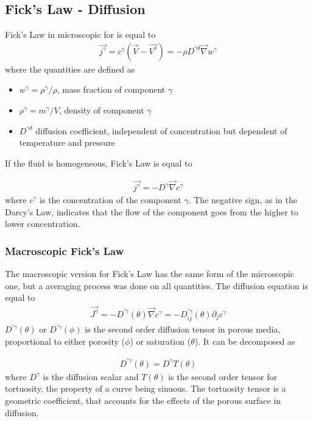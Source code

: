 \documentclass[11pt,twoside]{report}
\begin{document}
\subsection{Fick's Law -  Diffusion}\label{fick}
Fick's Law in microscopic for is equal to 
\begin{align}
   \vec{j^{\gamma}} = c^{\gamma}\left(\vec{V} - \vec{V^{\gamma}}\right) = -\rho D^{\gamma \delta}\vec{\nabla}w^{\gamma}
\end{align}
where the quantities are defined as 
\begin{itemize}
   \item $w^{\gamma} = \rho^{\gamma}/\rho$, mass fraction of component $\gamma$
   \item $\rho^{\gamma} = m^{\gamma}/V$, density of component $\gamma$
   \item $D^{\gamma \delta}$ diffusion coefficient, independent of concentration but dependent of temperature and pressure
\end{itemize}
If the fluid is homogeneous, Fick's Law is equal to

\begin{align}
   \vec{j^{\gamma}} = -D^{\gamma}\vec{\nabla}c^{\gamma}
\end{align}
where $c^{\gamma}$ is the concentration of the component $\gamma$. The negative sign, as in the Darcy's Law, indicates that the flow of the component goes from the higher to lower concentration. 

\subsubsection{Macroscopic Fick's Law}
The macroscopic version for Fick's Law has the same form of the microscopic one, but a averaging process was done on all quantities. The diffusion equation is equal to 
\begin{align}
\vec{J^{\gamma}} = - D^{'\gamma}(\theta)\vec{\nabla}c^{\gamma} = -D_{ij}^{'\gamma}(\theta)\partial_{j}c^{\gamma}
\end{align}
$D^{'\gamma}(\theta)$ or $D^{'\gamma}(\phi)$ is the second order diffusion tensor in porous media, proportional to either porosity ($\phi$) or saturation ($\theta$). It can be decomposed as

\begin{align}
   D^{'\gamma}(\theta) = D^{\gamma}T(\theta)
\end{align}
where $D^{\gamma}$ is the diffusion scalar and $T(\theta)$ is the second order tensor for tortuosity, the property of a curve being sinuous. The tortuosity tensor is a geometric coefficient, that accounts for the effects of the porous surface in diffusion. 
\end{document}
